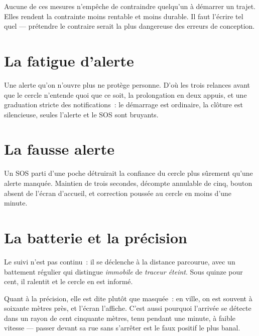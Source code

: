 \begin{alerte}
Aucune de ces mesures n'empêche de contraindre quelqu'un à démarrer un trajet. Elles rendent
la contrainte moins rentable et moins durable. Il faut l'écrire tel quel --- prétendre le
contraire serait la plus dangereuse des erreurs de conception.
\end{alerte}

\section{La fatigue d'alerte}

Une alerte qu'on n'ouvre plus ne protège personne. D'où les trois relances avant que le
cercle n'entende quoi que ce soit, la prolongation en deux appuis, et une graduation stricte
des notifications~: le démarrage est ordinaire, la clôture est silencieuse, seules l'alerte
et le SOS sont bruyants.

\section{La fausse alerte}

Un SOS parti d'une poche détruirait la confiance du cercle plus sûrement qu'une alerte
manquée. Maintien de trois secondes, décompte annulable de cinq, bouton absent de l'écran
d'accueil, et correction poussée au cercle en moins d'une minute.

\section{La batterie et la précision}

Le suivi n'est pas continu~: il se déclenche à la distance parcourue, avec un battement
régulier qui distingue \emph{immobile} de \emph{traceur éteint}. Sous quinze pour cent, il
ralentit et le cercle en est informé.

Quant à la précision, elle est dite plutôt que masquée~: en ville, on est souvent à
soixante mètres près, et l'écran l'affiche. C'est aussi pourquoi l'arrivée se détecte dans
un rayon de cent cinquante mètres, tenu pendant une minute, à faible vitesse --- passer
devant sa rue sans s'arrêter est le faux positif le plus banal.
